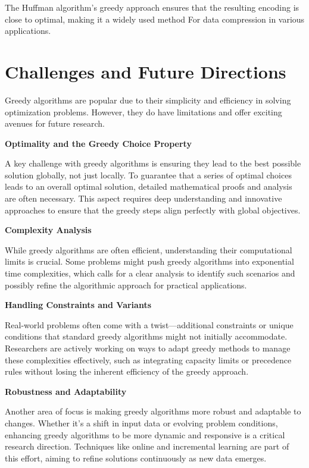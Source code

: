 \documentclass[12pt]{book} %
\begin{document}
The Huffman algorithm's greedy approach ensures that the resulting encoding is close to optimal, making it a widely used method For data compression in various applications.

\section{Challenges and Future Directions}

Greedy algorithms are popular due to their simplicity and efficiency in solving optimization problems. However, they do have limitations and offer exciting avenues for future research.

\textbf{Optimality and the Greedy Choice Property}

A key challenge with greedy algorithms is ensuring they lead to the best possible solution globally, not just locally. To guarantee that a series of optimal choices leads to an overall optimal solution, detailed mathematical proofs and analysis are often necessary. This aspect requires deep understanding and innovative approaches to ensure that the greedy steps align perfectly with global objectives.

\textbf{Complexity Analysis}

While greedy algorithms are often efficient, understanding their computational limits is crucial. Some problems might push greedy algorithms into exponential time complexities, which calls for a clear analysis to identify such scenarios and possibly refine the algorithmic approach for practical applications.

\textbf{Handling Constraints and Variants}

Real-world problems often come with a twist—additional constraints or unique conditions that standard greedy algorithms might not initially accommodate. Researchers are actively working on ways to adapt greedy methods to manage these complexities effectively, such as integrating capacity limits or precedence rules without losing the inherent efficiency of the greedy approach.

\textbf{Robustness and Adaptability}

Another area of focus is making greedy algorithms more robust and adaptable to changes. Whether it’s a shift in input data or evolving problem conditions, enhancing greedy algorithms to be more dynamic and responsive is a critical research direction. Techniques like online and incremental learning are part of this effort, aiming to refine solutions continuously as new data emerges.
\end{document}
